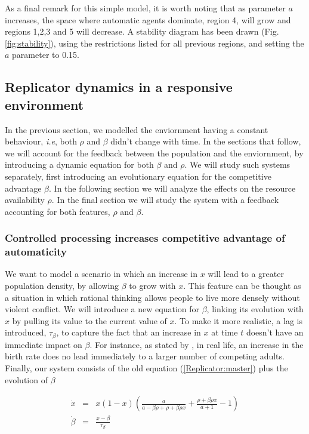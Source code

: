 \documentclass[10pt,a4paper]{article}
\begin{document}
As a final remark for this simple model, it is worth noting that as parameter $a$ increases, the space where automatic agents dominate, region 4, will grow and
regions 1,2,3 and 5 will decrease. A stability diagram has been drawn (Fig.\ref{fig:stability}), using the restrictions listed for all previous regions, and
setting the $a$ parameter to 0.15. 

\subsection{Replicator dynamics in a responsive environment}

In the previous section, we modelled the enviornment having a constant behaviour, \emph{i.e}, both $\rho$ and $\beta$ didn't change with time. In the sections
that follow, we will account for the feedback between the population and the enviornment, by introducing a dynamic equation for both $\beta$ and $\rho$. We
will study such systems separately, first introducing an evolutionary equation for the competitive advantage $\beta$. In the following section we will analyze
the effects on the resource availability $\rho$. In the final section we will study the system with a feedback accounting for both features, $\rho$ and $\beta$. 

\subsubsection{Controlled processing increases competitive advantage of automaticity}

We want to model a scenario in which an increase in $x$ will lead to a greater population density, by allowing $\beta$ to grow with $x$. This feature
can be thought as a situation in which rational thinking allows people to live more densely without violent conflict. We will introduce a new 
equation for $\beta$, linking its evolution with $x$ by pulling its value to the current value of $x$. To make it more realistic, a lag is introduced, 
$\tau_{\beta}$, to capture the fact that an increase in $x$ at time $t$ doesn't have an immediate impact on $\beta$. For instance, as stated by 
\cite{Strogatz:evolutionary}, in real life, an increase in 
the birth rate does no lead immediately to a larger number of competing adults. Finally, our system consists of the old equation (\ref{Replicator:master}) plus
the evolution of $\beta$

\begin{equation}
\begin{array}{lcl}
\dot{x} & = & x(1-x)\displaystyle\left( \frac{a}{a-\beta\rho+\rho+\beta\rho x} + \frac{\rho+\beta\rho x}{a+1} -1 \right)\\
\dot{\beta} & = & \displaystyle\frac{x-\beta}{\tau_{\beta}}
\end{array}
\label{eq:master_2}
\end{equation}
\end{document}
